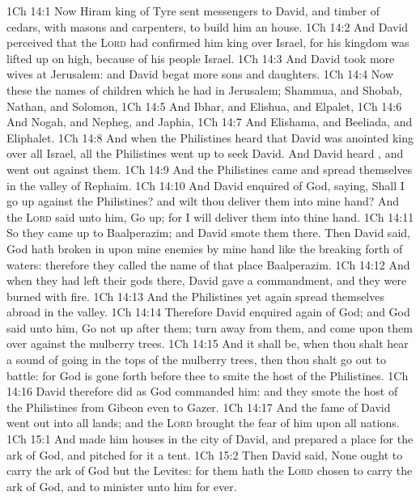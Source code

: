 \vs 1Ch 14:1 Now Hiram king of Tyre sent messengers to David, and timber of cedars, with masons and carpenters, to build him an house.
\vs 1Ch 14:2 And David perceived that the \textsc{Lord} had confirmed him king over Israel, for his kingdom was lifted up on high, because of his people Israel.
\vs 1Ch 14:3 And David took more wives at Jerusalem: and David begat more sons and daughters.
\vs 1Ch 14:4 Now these  the names of  children which he had in Jerusalem; Shammua, and Shobab, Nathan, and Solomon,
\vs 1Ch 14:5 And Ibhar, and Elishua, and Elpalet,
\vs 1Ch 14:6 And Nogah, and Nepheg, and Japhia,
\vs 1Ch 14:7 And Elishama, and Beeliada, and Eliphalet.
\vs 1Ch 14:8 And when the Philistines heard that David was anointed king over all Israel, all the Philistines went up to seek David. And David heard , and went out against them.
\vs 1Ch 14:9 And the Philistines came and spread themselves in the valley of Rephaim.
\vs 1Ch 14:10 And David enquired of God, saying, Shall I go up against the Philistines? and wilt thou deliver them into mine hand? And the \textsc{Lord} said unto him, Go up; for I will deliver them into thine hand.
\vs 1Ch 14:11 So they came up to Baalperazim; and David smote them there. Then David said, God hath broken in upon mine enemies by mine hand like the breaking forth of waters: therefore they called the name of that place Baalperazim.
\vs 1Ch 14:12 And when they had left their gods there, David gave a commandment, and they were burned with fire.
\vs 1Ch 14:13 And the Philistines yet again spread themselves abroad in the valley.
\vs 1Ch 14:14 Therefore David enquired again of God; and God said unto him, Go not up after them; turn away from them, and come upon them over against the mulberry trees.
\vs 1Ch 14:15 And it shall be, when thou shalt hear a sound of going in the tops of the mulberry trees,  then thou shalt go out to battle: for God is gone forth before thee to smite the host of the Philistines.
\vs 1Ch 14:16 David therefore did as God commanded him: and they smote the host of the Philistines from Gibeon even to Gazer.
\vs 1Ch 14:17 And the fame of David went out into all lands; and the \textsc{Lord} brought the fear of him upon all nations.
\vs 1Ch 15:1 And  made him houses in the city of David, and prepared a place for the ark of God, and pitched for it a tent.
\vs 1Ch 15:2 Then David said, None ought to carry the ark of God but the Levites: for them hath the \textsc{Lord} chosen to carry the ark of God, and to minister unto him for ever.
